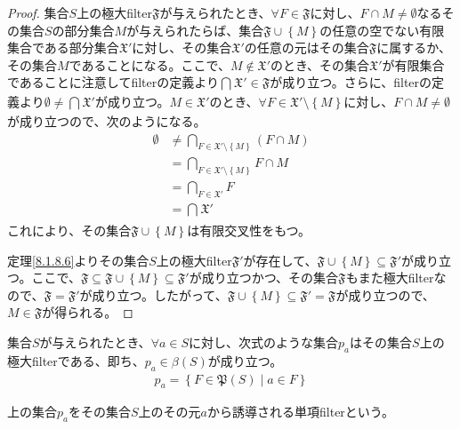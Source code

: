 \documentclass[dvipdfmx]{jsarticle}
\begin{document}
\begin{proof}
集合$S$上の極大filter$\mathfrak{F}$が与えられたとき、$\forall F \in \mathfrak{F}$に対し、$F \cap M \neq \emptyset$なるその集合$S$の部分集合$M$が与えられたらば、集合$\mathfrak{F \cup}\left\{ M \right\}$の任意の空でない有限集合である部分集合$\mathfrak{X}'$に対し、その集合$\mathfrak{X}'$の任意の元はその集合$\mathfrak{F}$に属するか、その集合$M$であることになる。ここで、$M \notin \mathfrak{X}'$のとき、その集合$\mathfrak{X}'$が有限集合であることに注意してfilterの定義より$\bigcap_{} \mathfrak{X}'\in \mathfrak{F}$が成り立つ。さらに、filterの定義より$\emptyset \neq \bigcap_{} \mathfrak{X}'$が成り立つ。$M \in \mathfrak{X}'$のとき、$\forall F \in \mathfrak{X}' \setminus \left\{ M \right\}$に対し、$F \cap M \neq \emptyset$が成り立つので、次のようになる。
\begin{align*}
\emptyset &\neq \bigcap_{F \in \mathfrak{X}' \setminus \left\{ M \right\}} (F \cap M)\\
&= \bigcap_{F \in \mathfrak{X}' \setminus \left\{ M \right\}} F \cap M\\
&= \bigcap_{F \in \mathfrak{X}'} F\\
&= \bigcap_{} \mathfrak{X}'
\end{align*}
これにより、その集合$\mathfrak{F \cup}\left\{ M \right\}$は有限交叉性をもつ。\par
定理\ref{8.1.8.6}よりその集合$S$上の極大filter$\mathfrak{F}'$が存在して、$\mathfrak{F \cup}\left\{ M \right\} \subseteq \mathfrak{F}'$が成り立つ。ここで、$\mathfrak{F \subseteq F \cup}\left\{ M \right\} \subseteq \mathfrak{F}'$が成り立つかつ、その集合$\mathfrak{F}$もまた極大filterなので、$\mathfrak{F} = \mathfrak{F}'$が成り立つ。したがって、$\mathfrak{F \cup}\left\{ M \right\} \subseteq \mathfrak{F}' = \mathfrak{F}$が成り立つので、$M \in \mathfrak{F}$が得られる。
\end{proof}
\begin{thm}\label{8.1.8.8}
集合$S$が与えられたとき、$\forall a \in S$に対し、次式のような集合$p_{a}$はその集合$S$上の極大filterである、即ち、$p_{a} \in \beta(S)$が成り立つ。
\begin{align*}
p_{a} = \left\{ F \in \mathfrak{P}(S) \middle| a \in F \right\}
\end{align*}
\end{thm}
\begin{dfn}
上の集合$p_{a}$をその集合$S$上のその元$a$から誘導される単項filterという。
\end{dfn}
\end{document}
